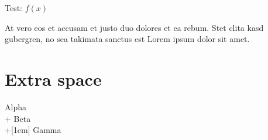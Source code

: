 \documentclass{article}
\begin{document}
\begin{tcolorbox}
    Test: $f(x)$
\end{tcolorbox}

\noindent At vero eos et accusam et justo duo dolores et ea rebum. Stet clita
kasd gubergren, no sea takimata sanctus est Lorem ipsum dolor sit amet.

\section*{Extra space}

\begin{pseudo}[indent-mark, extra-space=1.5ex]
Alpha \\+
Beta  \\+[1cm]
Gamma
\end{pseudo}





\end{document}
